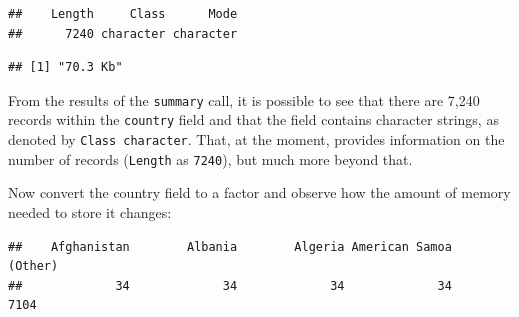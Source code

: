 \documentclass[
]{book}
\newenvironment{Shaded}{\begin{snugshade}}{\end{snugshade}}
\newcommand{\AttributeTok}[1]{\textcolor[rgb]{0.13,0.29,0.53}{#1}}
\newcommand{\CommentTok}[1]{\textcolor[rgb]{0.56,0.35,0.01}{\textit{#1}}}
\newcommand{\DecValTok}[1]{\textcolor[rgb]{0.00,0.00,0.81}{#1}}
\newcommand{\FunctionTok}[1]{\textcolor[rgb]{0.13,0.29,0.53}{\textbf{#1}}}
\newcommand{\NormalTok}[1]{#1}
\newcommand{\OtherTok}[1]{\textcolor[rgb]{0.56,0.35,0.01}{#1}}
\newcommand{\SpecialCharTok}[1]{\textcolor[rgb]{0.81,0.36,0.00}{\textbf{#1}}}
\newcommand{\StringTok}[1]{\textcolor[rgb]{0.31,0.60,0.02}{#1}}
\begin{document}
\begin{verbatim}
##    Length     Class      Mode 
##      7240 character character
\end{verbatim}

\begin{Shaded}
\end{Shaded}

\begin{verbatim}
## [1] "70.3 Kb"
\end{verbatim}

From the results of the \texttt{summary} call, it is possible to see that there are 7,240 records within the \texttt{country} field and that the field contains character strings, as denoted by \texttt{Class\ character}. That, at the moment, provides information on the number of records (\texttt{Length} as \texttt{7240}), but much more beyond that.

Now convert the country field to a factor and observe how the amount of memory needed to store it changes:

\begin{Shaded}
\end{Shaded}

\begin{verbatim}
##    Afghanistan        Albania        Algeria American Samoa        (Other) 
##             34             34             34             34           7104
\end{verbatim}
\end{document}
